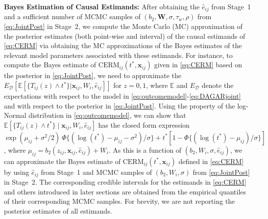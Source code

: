\documentclass[aoas]{imsart}
\theoremstyle{plain}
\theoremstyle{definition}
\begin{document}
\textbf{Bayes Estimation of Causal Estimands:}
After obtaining the $\hat{e}_{ij}$ from Stage~1 and a sufficient number of MCMC samples of $(b_2, \mathbf{W}, \sigma, \tau_w, \rho)$ from \eqref{eq:JointPost} in Stage~2, we compute the Monte Carlo (MC) approximation of the posterior estimates (both point-wise and interval) of the causal estimands of \eqref{eq:CERM} via obtaining the MC approximations of the Bayes estimates of the relevant model parameters associated with these estimands. 
For instance, to compute the Bayes estimate of $\text{CERM}_{ij}(t^*, \mathbf{x}_{ij})$ given in \eqref{eq:CERM} based on the posterior in  \eqref{eq:JointPost}, 
we need to approximate the $E_{\mathcal{D}}[\mathbb{E}[\{T_{ij}(z)\wedge t^*\}\vert \mathbf{x}_{ij},W_i,\hat{e}_{ij}]]$ for $z=0,1$, 
where $\mathbb{E}$ and $E_{\mathcal{D}}$ denote the expectations 
with respect to the model in \eqref{eq:outcomemodel}-\eqref{eq:DAGARjoint} and with respect to the posterior in \eqref{eq:JointPost}. 
Using the property of the log-Normal distribution in \eqref{eq:outcomemodel}, we can show that 
$\mathbb{E}[\{T_{ij}(z)\wedge t^*\}\mid \mathbf{x}_{ij},W_i,\hat{e}_{ij}]$ has the closed form expression
$\exp(\mu_{ij}+ \sigma^2/2)\ \Phi\{(\log(t^*) -\mu_{ij} -\sigma^2)/\sigma\} + t^* [1 - \Phi\{({\log(t^*) - \mu_{ij}})/ {\sigma}\} ]$, 
where $\mu_{ij} = b_2(z_{ij}, \mathbf{x}_{ij}, \hat{e}_{ij}) + W_i $. 
As this is a function of $(b_2,W_i,\sigma,\hat{e}_{ij})$, we can approximate the Bayes estimate of ${\text{CERM}_{ij}}(t^*, \mathbf{x}_{ij})$ defined in \eqref{eq:CERM}  by using $\hat{e}_{ij}$ from Stage~1 and MCMC samples of $(b_2,W_i,\sigma)$ from \eqref{eq:JointPost} in Stage~2. 
The corresponding credible intervals for the estimands in \eqref{eq:CERM} and others introduced in later sections are obtained from the empirical quantiles of their corresponding MCMC samples. For brevity, we are not reporting the posterior estimates of all estimands. 
\end{document}
